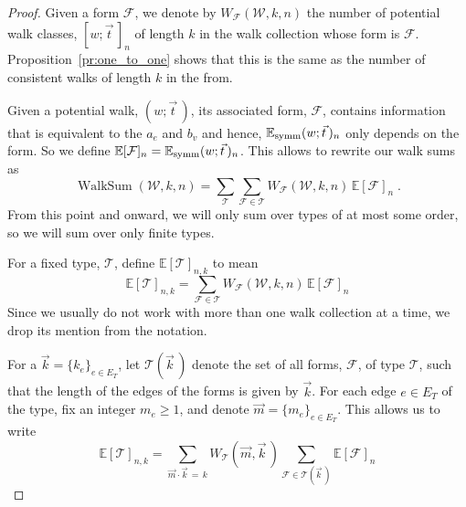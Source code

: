 \documentclass{memo-l}
\theoremstyle{plain}
\theoremstyle{definition}
\numberwithin{section}{chapter}
\numberwithin{equation}{chapter}
\DeclareMathOperator{\WalkSum}{WalkSum}
\newcommand{\potwalk}{(w;\vec t\,)}
\newcommand{\potwalkclass}{[w;\vec t\,]_n}
\theoremstyle{plain}
\theoremstyle{definition}
\newcommand\EE{\mathbb{E}}
\newcommand\cF{\mathcal{F}}
\newcommand\cT{\mathcal{T}}
\newcommand\cW{\mathcal{W}}
\begin{document}
\begin{proof} Given a form \( \cF \), we denote
by \( W_\cF(\cW,k,n) \) the number of potential walk classes, \(
\potwalkclass \) of length \(k\) in the walk collection whose form is \(
\cF \). 
Proposition~\ref{pr:one_to_one}
shows that this is the same as the number
of consistent walks of length \(k\) in the from.

Given a potential walk, \( \potwalk \), its associated form, \( \cF \),
contains information that is equivalent to the \( a_e \) and \( b_v \) and
hence, \( \EE_{\rm{symm}}\potwalk_n \) only depends on the form. So we
define \( \EE[\cF]_n = \EE_{\rm{symm}}\potwalk_n \). This allows to rewrite
our walk sums as \[ \WalkSum(\cW,k,n) = \sum_{\cT} \sum_{\cF \in \cT}
W_\cF(\cW,k,n) \,\EE[\cF]_n \;. \] 
From this point and onward, we will only sum over types of
at most some order, so we will sum over only finite types.

For a fixed type, \( \cT \), define \( \EE[\cT]_{n,k} \) to mean \[
\EE[\cT]_{n,k} = \sum_{\cF \in \cT} W_\cF(\cW,k,n) \,\EE[\cF]_n \] Since we
usually do not work with more than one walk collection at a time, we drop
its mention from the notation.

For a \( \vec k = \{ k_e\}_{e \in E_T} \), let \( \cT(\vec k\,) \) denote
the set of all forms, \( \cF \), of type \( \cT \), such that the length of
the edges of the forms is given by \( \vec k \). For each edge \( e \in E_T
\) of the type, fix an integer \( m_e \geq 1 \), and denote \( \vec m = \{
m_e \}_{e \in E_T} \). This allows us to write \[ \EE[\cT]_{n,k} =
\sum_{\vec m \cdot \vec k \,=\, k} W_\cT(\vec m, \vec k\,) \sum_{\cF \in
\cT(\vec k\,)} \EE[\cF]_n \]


\end{proof}
\end{document}

